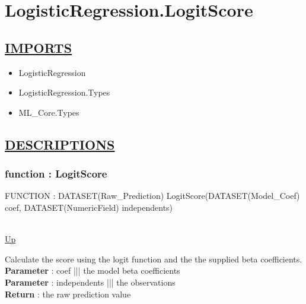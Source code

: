 \chapter*{LogisticRegression.LogitScore}
\hypertarget{LogisticRegression.LogitScore}{}

\section*{\underline{IMPORTS}}
\begin{itemize}
\item LogisticRegression
\item LogisticRegression.Types
\item ML\_Core.Types
\end{itemize}

\section*{\underline{DESCRIPTIONS}}
\subsection*{function : LogitScore}
\hypertarget{ecldoc:logisticregression.logitscore}{FUNCTION : DATASET(Raw\_Prediction) LogitScore(DATASET(Model\_Coef) coef, DATASET(NumericField) independents)} \\
\hyperlink{ecldoc:}{Up} \\
\par
Calculate the score using the logit function and the the supplied beta coefficients. \\
\textbf{Parameter} : coef ||| the model beta coefficients \\
\textbf{Parameter} : independents ||| the observations \\
\textbf{Return} : the raw prediction value \\
